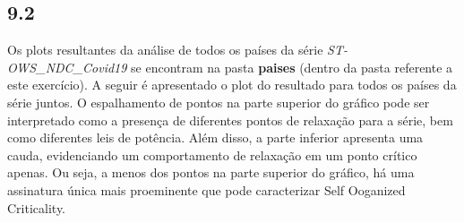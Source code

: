 \clearpage
\subsection*{9.2}
%

Os plots resultantes da análise de todos os países da série \textit{ST-OWS\_NDC\_Covid19} se encontram na pasta \textbf{paises} (dentro da pasta referente a este exercício). A seguir é apresentado o plot do resultado para todos os países da série juntos. O espalhamento de pontos na parte superior do gráfico pode ser interpretado como a presença de diferentes pontos de relaxação para a série, bem como diferentes leis de potência. Além disso, a parte inferior apresenta uma cauda, evidenciando um comportamento de relaxação em um ponto crítico apenas. Ou seja, a menos dos pontos na parte superior do gráfico, há uma assinatura única mais proeminente que pode caracterizar Self Ooganized Criticality.

\begin{figure}[ht!]
	\vspace{0mm}	%
	\begin{center}
	\end{center}
	\vspace{-2mm}	%
	\label{ex9_fig1}
\end{figure}

